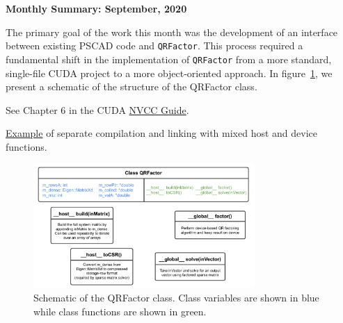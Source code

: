 \documentclass[11pt,letterpaper]{article}
\begin{document}
\begin{center}
    {\Large \bf Monthly Summary: September, 2020}
\end{center}

The primary goal of the work this month was the development of an interface between existing PSCAD code and \verb+QRFactor+. This process required a fundamental shift in the implementation of \verb+QRFactor+ from a more standard, single-file CUDA project to a more object-oriented approach. In figure~\ref{f:OO}, we present a schematic of the structure of the QRFactor class.

See Chapter 6 in the CUDA \href{https://docs.nvidia.com/cuda/pdf/CUDA_Compiler_Driver_NVCC.pdf}{NVCC Guide}. 

\href{https://developer.nvidia.com/blog/separate-compilation-linking-cuda-device-code/}{Example} of separate compilation and linking with mixed host and device functions.

\begin{figure}[ht]
    \centering
    \includegraphics[width=0.75\textwidth]{MHI QRFactor.pdf}
    \caption{Schematic of the QRFactor class. Class variables are shown in blue while class functions are shown in green.}
    \label{f:OO}
\end{figure}



\end{document}
